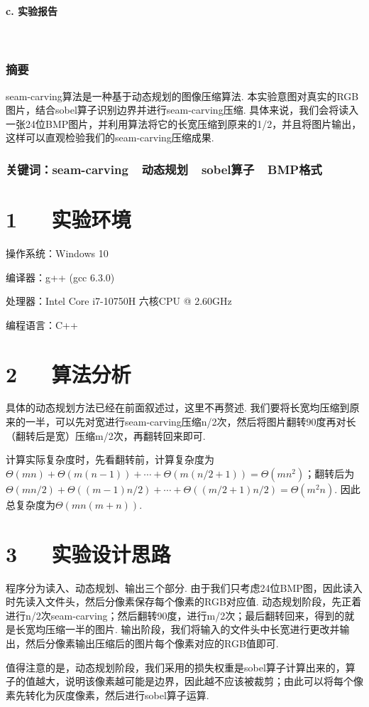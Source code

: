 \documentclass[UTF8]{ctexart}
\begin{document}
\paragraph{c. 实验报告}\  \par
\subsubsection*{摘要}
{\kaishu\normalsize  seam-carving算法是一种基于动态规划的图像压缩算法. 本实验意图对真实的RGB图片，结合sobel算子识别边界并进行seam-carving压缩. 具体来说，我们会将读入一张24位BMP图片，并利用算法将它的长宽压缩到原来的1/2，并且将图片输出，这样可以直观检验我们的seam-carving压缩成果.}
\subsubsection*{关键词：seam-carving\ \ 动态规划\ \ sobel算子\ \  BMP格式\vspace{1.5em}}

\section*{1\ \ \ 实验环境}
操作系统：Windows 10\par
编译器：g++ (gcc 6.3.0)\par
处理器：Intel Core i7-10750H 六核CPU @ 2.60GHz\par
编程语言：C++
\section*{2\ \ \ 算法分析}
具体的动态规划方法已经在前面叙述过，这里不再赘述. 我们要将长宽均压缩到原来的一半，可以先对宽进行seam-carving压缩n/2次，然后将图片翻转90度再对长（翻转后是宽）压缩m/2次，再翻转回来即可.\par
计算实际复杂度时，先看翻转前，计算复杂度为$\Theta(mn)+\Theta(m(n-1))+\cdots + \Theta(m(n/2 + 1)) = \Theta(mn^2)$；翻转后为$\Theta(mn/2)+\Theta((m-1)n/2)+\cdots + \Theta((m/2 + 1)n/2) = \Theta(m^2n)$. 因此总复杂度为$\Theta(mn(m+n))$.
\section*{3\ \ \ 实验设计思路}
程序分为读入、动态规划、输出三个部分. 由于我们只考虑24位BMP图，因此读入时先读入文件头，然后分像素保存每个像素的RGB对应值. 动态规划阶段，先正着进行n/2次seam-carving；然后翻转90度，进行m/2次；最后翻转回来，得到的就是长宽均压缩一半的图片. 输出阶段，我们将输入的文件头中长宽进行更改并输出，然后分像素输出压缩后的图片每个像素对应的RGB值即可.\par
值得注意的是，动态规划阶段，我们采用的损失权重是sobel算子计算出来的，算子的值越大，说明该像素越可能是边界，因此越不应该被裁剪；由此可以将每个像素先转化为灰度像素，然后进行sobel算子运算.
\end{document}
